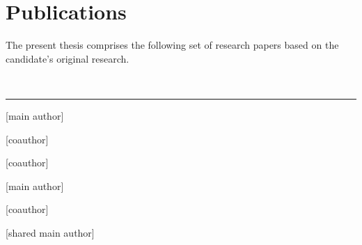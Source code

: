 
\chapter[publications]{Publications}

\newcommand{\main}{{\color{paper_main}[main author]}}
\newcommand{\shared}{{\color{paper_shared}[shared main author]}}
\newcommand{\co}{{\color{paper_co}[coauthor]}}

The present thesis comprises the following set of research papers based on the candidate's original research. 

\vspace{5mm}

\raggedright\par\noindent\hspace{8mm}{\Large\scshape primary}\\[-2mm]

\raggedleft\rule{\textwidth - 8mm}{0.4pt}

\begin{enumerate}[leftmargin=8mm,topsep=0mm,label={[\Alph*]}]
    \item {} \main \label{enumerate: paper-hierarchical}
    \item {} \co \label{enumerate: paper-modelagnostic}
    \item {} \co \label{enumerate: paper-brief}
    \item {} \main \label{enumerate: paper-benchmarking}
    \item {} \co \label{enumerate: paper-automated}
    \item {} \shared \label{enumerate: paper-retrospective}
\end{enumerate}





